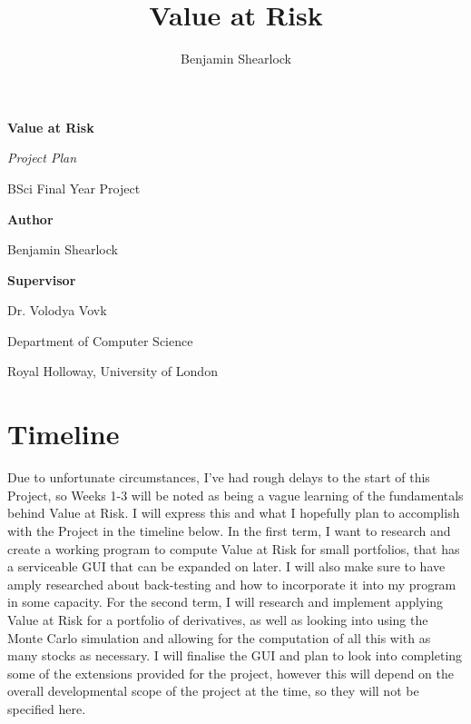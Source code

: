 \documentclass{article}
\title{Value at Risk}
\author{Benjamin Shearlock}
\begin{document}
\begin{titlepage}
  \begin{center}
    \vspace*{1cm}
    {\LARGE \textbf{Value at Risk} \par} 
    \vspace{1.5cm}
    {\Large \textit{Project Plan} \par} 
    \vspace{0.5cm}
    {\Large BSci Final Year Project \par}
    \vspace{2cm}
    {\large \textbf{Author} \par}
    {\large Benjamin Shearlock \par}
    \vspace{2cm}
    {\large \textbf{Supervisor} \par}
    {\large Dr. Volodya Vovk \par}
    \vfill
    {\large Department of Computer Science \par}
    {\large Royal Holloway, University of London \par}
  \end{center}
\end{titlepage}



\section{Timeline}
Due to unfortunate circumstances, I've had rough delays to the start of this Project, so Weeks 1-3 will be noted as being a vague learning of the fundamentals behind Value at Risk. I will express this and what I hopefully plan to accomplish with the Project in the timeline below. In the first term, I want to research and create a working program to compute Value at Risk for small portfolios, that has a serviceable GUI that can be expanded on later. I will also make sure to have amply researched about back-testing and how to incorporate it into my program in some capacity. For the second term, I will research and implement applying Value at Risk for a portfolio of derivatives, as well as looking into using the Monte Carlo simulation and allowing for the computation of all this with as many stocks as necessary. I will finalise the GUI and plan to look into completing some of the extensions provided for the project, however this will depend on the overall developmental scope of the project at the time, so they will not be specified here.
\end{document}
